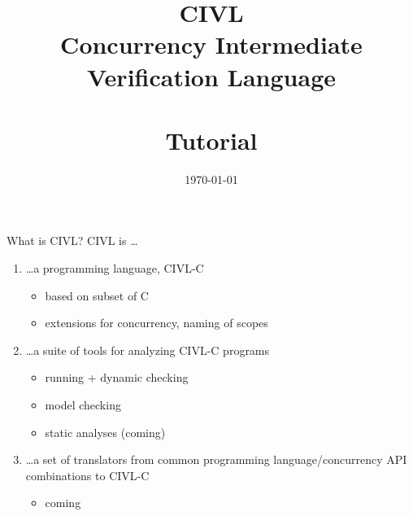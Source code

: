 \documentclass[t]{beamer}
\date{\today}
\title{{\huge\bf CIVL}\\
  Concurrency Intermediate Verification Language\\ \ \\
  Tutorial}
\begin{document}
\begin{frame}[plain]
  \titlepage
\end{frame}

\begin{frame}{What is CIVL?}
  CIVL is \ldots
  \begin{enumerate}
  \item \ldots a programming language, \alert{CIVL-C}
    \begin{itemize}
    \item based on subset of C
    \item extensions for concurrency, naming of scopes
    \end{itemize}
  \item \ldots a suite of tools for analyzing CIVL-C programs
    \begin{itemize}
    \item running + dynamic checking
    \item model checking
    \item static analyses (coming)
    \end{itemize}
  \item \ldots a set of translators from common programming
    language/concurrency API combinations to CIVL-C
    \begin{itemize}
    \item coming
    \end{itemize}
  \end{enumerate}
\end{frame}
\end{document}
